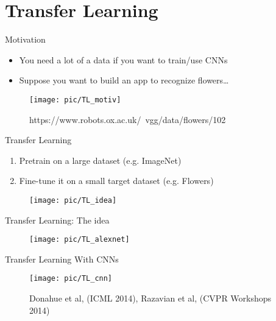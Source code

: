\documentclass[serif, aspectratio=169]{beamer}
\begin{document}
\section{Transfer Learning}
\begin{frame}{Motivation}
	\begin{itemize}
		\item You need a lot of a data if you want to train/use CNNs
		\item Suppose you want to build an app to recognize flowers…
	\end{itemize}
	\begin{figure}[htpb]
		\begin{center}
			\texttt{[image: pic/TL\_motiv]}
			\caption*{\scriptsize https://www.robots.ox.ac.uk/~vgg/data/flowers/102}
		\end{center}
	\end{figure}
\end{frame}

\begin{frame}{Transfer Learning}
	\begin{enumerate}
		\item Pretrain on a large dataset (e.g. ImageNet)
		\item Fine-tune it on a small target dataset (e.g. Flowers)
	\end{enumerate}

	\begin{figure}
		\texttt{[image: pic/TL\_idea]}
	\end{figure}
\end{frame}

\begin{frame}{Transfer Learning: The idea}
	\vspace{-1em}
	\begin{figure}[htpb]
		\begin{center}
			\texttt{[image: pic/TL\_alexnet]}
		\end{center}
	\end{figure}
\end{frame}

\begin{frame}{Transfer Learning With CNNs}
	\begin{figure}[htpb]
		\begin{center}
			\texttt{[image: pic/TL\_cnn]}
			\caption*{\scriptsize Donahue et al, (ICML 2014), Razavian et al, (CVPR Workshops 2014)}
		\end{center}
	\end{figure}
\end{frame}
\end{document}
